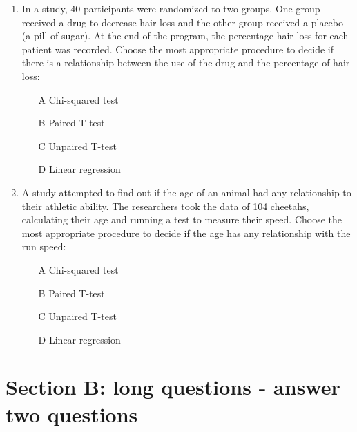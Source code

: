 \documentclass{article}
\newif\ifanswer
\begin{document}
\begin{enumerate}
\ifanswer
(Answer: B)
\fi

\item In a study, 40 participants were randomized to two groups. One
  group received a drug to decrease hair loss and the other group
  received a placebo (a pill of sugar). At the end of the program, the
  percentage hair loss for each patient was recorded. Choose the most
  appropriate procedure to decide if there is a relationship between
  the use of the drug and the percentage of hair loss:
\begin{itemize}
\item[A] Chi-squared test 
\item[B] Paired T-test
\item[C] Unpaired T-test
\item[D] Linear regression
\end{itemize}

\ifanswer
(Answer: C)
\fi

\item A study attempted to find out if the age of an animal had any
  relationship to their athletic ability. The researchers took the
  data of 104 cheetahs, calculating their age and running a test to
  measure their speed. Choose the most appropriate procedure to decide
  if the age has any relationship with the run speed:
\begin{itemize}
\item[A] Chi-squared test
\item[B] Paired T-test
\item[C] Unpaired T-test
\item[D] Linear regression
\end{itemize}

\ifanswer
(Answer: D)
\fi

\end{enumerate}
  
\section*{Section B: long questions - answer two questions}
\end{document}
